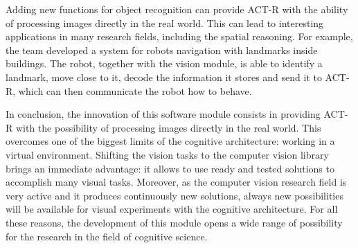 	Adding new functions for object recognition can provide \mbox{ACT-R} with the ability of processing images directly in the real world. 
	This can lead to interesting applications in many research fields, including the spatial reasoning. 
	For example, the team developed a system for robots navigation with landmarks inside buildings. 
	The robot, together with the vision module, is able to identify a landmark, move close to it, decode the information it stores and send it to \mbox{ACT-R}, which can then communicate the robot how to behave.


	In conclusion, the innovation of this software module consists in providing \mbox{ACT-R} with the possibility of processing images directly in the real world.
	This overcomes one of the biggest limits of the cognitive architecture: working in a virtual environment.
	Shifting the vision tasks to the computer vision library brings an immediate advantage: it allows to use ready and tested solutions to accomplish many visual tasks.
	Moreover, as the computer vision research field is very active and it produces continuously new solutions, always new possibilities will be available for visual experiments with the cognitive architecture.
	For all these reasons, the development of this module opens a wide range of possibility for the research in the field of cognitive science.



\begin{comment}	
		migliorare le performance dell'algoritmo in modo tale che la shape detection sia utilizzata in tempo reale pnell'ambito della navigazione con robot.
\end{comment}	
